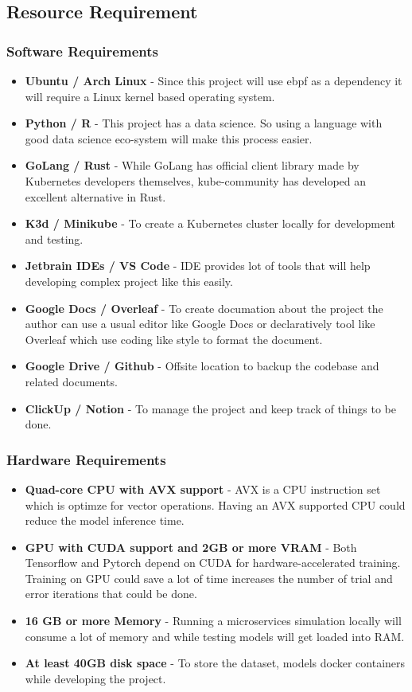 \subsection{Resource Requirement}

\subsubsection{Software Requirements}

\begin{itemize}[noitemsep,nolistsep] 
\item \textbf{Ubuntu / Arch Linux} - Since this project will use \ac{ebpf} as a dependency it will require a Linux kernel based operating system.
\item \textbf{Python / R} - This project has a data science. So using a language with good data science eco-system will make this process easier.
\item \textbf{GoLang / Rust} - While GoLang has official client library made by Kubernetes developers themselves, kube-community has developed an excellent alternative in Rust.
\item \textbf{K3d / Minikube} - To create a Kubernetes cluster locally for development and testing.
\item \textbf{Jetbrain IDEs / VS Code} - IDE provides lot of tools that will help developing complex project like this easily.
\item \textbf{Google Docs / Overleaf}  - To create documation about the project the author can use a usual editor like Google Docs or declaratively tool like Overleaf which use coding like style to format the document.
\item \textbf{Google Drive / Github} - Offsite location to backup the codebase and related documents.
\item \textbf{ClickUp / Notion} - To manage the project and keep track of things to be done.
\end{itemize}

\subsubsection{Hardware Requirements}
\begin{itemize}[noitemsep,nolistsep] 
    \item \textbf{Quad-core CPU with AVX support} - AVX is a CPU instruction set which is optimze for vector operations. Having an AVX supported CPU could reduce the model inference time.
    \item \textbf{GPU with CUDA support and 2GB or more VRAM} - Both Tensorflow and Pytorch depend on CUDA for hardware-accelerated training. Training on GPU could save a lot of time increases the number of trial and error iterations that could be done.
    \item \textbf{16 GB or more Memory} - Running a microservices simulation locally will consume a lot of memory and while testing models will get loaded into RAM.
    \item \textbf{At least 40GB disk space} - To store the dataset, models docker containers while developing the project.
\end{itemize}


